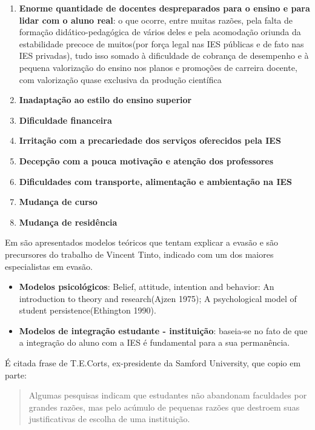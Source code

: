 \documentclass{report}
\begin{document}
\begin{enumerate}
\item \textbf{Enorme quantidade de docentes despreparados para o ensino e para lidar com o aluno real}: o que ocorre, entre muitas razões, pela falta de formação didático-pedagógica de vários deles e pela acomodação oriunda da estabilidade precoce de muitos(por força legal nas IES públicas e de fato nas IES privadas), tudo isso somado à dificuldade de cobrança de desempenho e à pequena valorização do ensino nos planos e promoções de carreira docente, com valorização quase exclusiva da produção científica

\item \textbf{Inadaptação ao estilo do ensino superior}

\item \textbf{Dificuldade financeira}

\item \textbf{Irritação com a precariedade dos serviços oferecidos pela IES}

\item \textbf{Decepção com a pouca motivação e atenção dos professores}

\item \textbf{Dificuldades com transporte, alimentação e ambientação na IES}

\item \textbf{Mudança de curso}

\item \textbf{Mudança de residência}

\end{enumerate}

Em \cite{evasao_panorama2} são apresentados modelos teóricos que tentam explicar a evasão e são precursores do trabalho de Vincent Tinto, indicado com um dos maiores especialistas em evasão.

\begin{itemize}
\item \textbf{Modelos psicológicos}: Belief, attitude, intention and behavior: An introduction to theory and research(Ajzen 1975); A psychological model of student persistence(Ethington 1990).

\item \textbf{Modelos de integração estudante - instituição}: baseia-se no fato de que a integração do aluno com a IES é fundamental para a sua permanência.
\end{itemize}

É citada frase de T.E.Corts, ex-presidente da Samford University, que copio em parte:
\begin{quote}
Algumas pesquisas indicam que estudantes não abandonam faculdades por grandes razões, mas pelo acúmulo de pequenas razões que destroem suas justificativas de escolha de uma instituição.
\end{quote}
\end{document}
